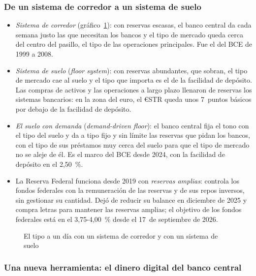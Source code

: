 \documentclass[11pt]{article}
\begin{document}
\subsubsection{De un sistema de corredor a un sistema de suelo}\label{sec:corredor-suelo}

\begin{itemize}
\item \emph{Sistema de corredor} (gráfico~\ref{fig:pasillo-suelo}): con reservas escasas, el banco central da cada semana justo las que necesitan los bancos y el tipo de mercado queda cerca del centro del pasillo, el tipo de las operaciones principales. Fue el del BCE de 1999 a 2008.
\item \emph{Sistema de suelo} (\emph{floor system}): con reservas abundantes, que sobran, el tipo de mercado cae al suelo y el tipo que importa es el de la facilidad de depósito. Las compras de activos y las operaciones a largo plazo llenaron de reservas los sistemas bancarios: en la zona del euro, el €STR queda unos 7~puntos básicos por debajo de la facilidad de depósito\nocite{BieberLizarazo2026Liquidez}.
\item \emph{El suelo con demanda} (\emph{demand-driven floor}): el banco central fija el tono con el tipo del suelo y da a tipo fijo y sin límite las reservas que pidan los bancos, con el tipo de sus préstamos muy cerca del suelo para que el tipo de mercado no se aleje de él. Es el marco del BCE desde 2024, con la facilidad de depósito en el 2,50~\%\nocite{BCE2024Marco,BCE2026TiposOficiales}.
\item La Reserva Federal funciona desde 2019 con \emph{reservas amplias}: controla los fondos federales con la remuneración de las reservas y de sus repos inversos, sin gestionar su cantidad\nocite{Fed2019Amplias}. Dejó de reducir su balance en diciembre de 2025 y compra letras para mantener las reservas amplias\nocite{Fed2025FOMCdic}; el objetivo de los fondos federales está en el 3,75-4,00~\% desde el 17~de septiembre de 2026\nocite{FRED2026FedTipos}.
\end{itemize}

\begin{figure}[H]
\centering
\caption{El tipo a un día con un sistema de corredor y con un sistema de suelo}\label{fig:pasillo-suelo}
\end{figure}

\subsubsection{Una nueva herramienta: el dinero digital del banco central}\label{sec:euro-digital}
\end{document}
